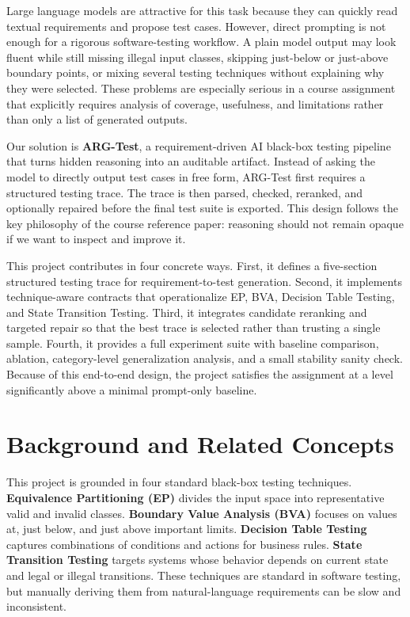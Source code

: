 \documentclass{article}
\begin{document}
Large language models are attractive for this task because they can quickly read textual requirements and propose test cases. However, direct prompting is not enough for a rigorous software-testing workflow. A plain model output may look fluent while still missing illegal input classes, skipping just-below or just-above boundary points, or mixing several testing techniques without explaining why they were selected. These problems are especially serious in a course assignment that explicitly requires analysis of coverage, usefulness, and limitations rather than only a list of generated outputs.

Our solution is \textbf{ARG-Test}, a requirement-driven AI black-box testing pipeline that turns hidden reasoning into an auditable artifact. Instead of asking the model to directly output test cases in free form, ARG-Test first requires a structured testing trace. The trace is then parsed, checked, reranked, and optionally repaired before the final test suite is exported. This design follows the key philosophy of the course reference paper: reasoning should not remain opaque if we want to inspect and improve it.

This project contributes in four concrete ways. First, it defines a five-section structured testing trace for requirement-to-test generation. Second, it implements technique-aware contracts that operationalize EP, BVA, Decision Table Testing, and State Transition Testing. Third, it integrates candidate reranking and targeted repair so that the best trace is selected rather than trusting a single sample. Fourth, it provides a full experiment suite with baseline comparison, ablation, category-level generalization analysis, and a small stability sanity check. Because of this end-to-end design, the project satisfies the assignment at a level significantly above a minimal prompt-only baseline.

\section{Background and Related Concepts}
This project is grounded in four standard black-box testing techniques. \textbf{Equivalence Partitioning (EP)} divides the input space into representative valid and invalid classes. \textbf{Boundary Value Analysis (BVA)} focuses on values at, just below, and just above important limits. \textbf{Decision Table Testing} captures combinations of conditions and actions for business rules. \textbf{State Transition Testing} targets systems whose behavior depends on current state and legal or illegal transitions. These techniques are standard in software testing, but manually deriving them from natural-language requirements can be slow and inconsistent.
\end{document}
